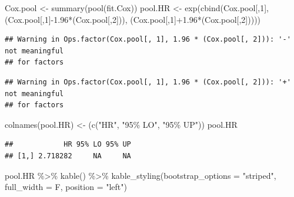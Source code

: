 \documentclass[
]{book}
\newenvironment{Shaded}{\begin{snugshade}}{\end{snugshade}}
\newcommand{\AttributeTok}[1]{\textcolor[rgb]{0.77,0.63,0.00}{#1}}
\newcommand{\DecValTok}[1]{\textcolor[rgb]{0.00,0.00,0.81}{#1}}
\newcommand{\FloatTok}[1]{\textcolor[rgb]{0.00,0.00,0.81}{#1}}
\newcommand{\FunctionTok}[1]{\textcolor[rgb]{0.00,0.00,0.00}{#1}}
\newcommand{\NormalTok}[1]{#1}
\newcommand{\OtherTok}[1]{\textcolor[rgb]{0.56,0.35,0.01}{#1}}
\newcommand{\SpecialCharTok}[1]{\textcolor[rgb]{0.00,0.00,0.00}{#1}}
\newcommand{\StringTok}[1]{\textcolor[rgb]{0.31,0.60,0.02}{#1}}
\begin{document}
\begin{Shaded}
\begin{Highlighting}[]
\NormalTok{Cox.pool }\OtherTok{\textless{}{-}} \FunctionTok{summary}\NormalTok{(}\FunctionTok{pool}\NormalTok{(fit.Cox))}
\NormalTok{pool.HR }\OtherTok{\textless{}{-}} \FunctionTok{exp}\NormalTok{(}\FunctionTok{cbind}\NormalTok{(Cox.pool[,}\DecValTok{1}\NormalTok{], (Cox.pool[,}\DecValTok{1}\NormalTok{]}\SpecialCharTok{{-}}\FloatTok{1.96}\SpecialCharTok{*}\NormalTok{(Cox.pool[,}\DecValTok{2}\NormalTok{])), }
\NormalTok{           (Cox.pool[,}\DecValTok{1}\NormalTok{]}\SpecialCharTok{+}\FloatTok{1.96}\SpecialCharTok{*}\NormalTok{(Cox.pool[,}\DecValTok{2}\NormalTok{]))))}
\end{Highlighting}
\end{Shaded}

\begin{verbatim}
## Warning in Ops.factor(Cox.pool[, 1], 1.96 * (Cox.pool[, 2])): '-' not meaningful
## for factors
\end{verbatim}

\begin{verbatim}
## Warning in Ops.factor(Cox.pool[, 1], 1.96 * (Cox.pool[, 2])): '+' not meaningful
## for factors
\end{verbatim}

\begin{Shaded}
\begin{Highlighting}[]
\FunctionTok{colnames}\NormalTok{(pool.HR) }\OtherTok{\textless{}{-}}\NormalTok{ (}\FunctionTok{c}\NormalTok{(}\StringTok{"HR"}\NormalTok{, }\StringTok{"95\% LO"}\NormalTok{, }\StringTok{"95\% UP"}\NormalTok{))}
\NormalTok{pool.HR}
\end{Highlighting}
\end{Shaded}

\begin{verbatim}
##            HR 95% LO 95% UP
## [1,] 2.718282     NA     NA
\end{verbatim}

\begin{Shaded}
\begin{Highlighting}[]
\NormalTok{pool.HR }\SpecialCharTok{\%\textgreater{}\%}
  \FunctionTok{kable}\NormalTok{() }\SpecialCharTok{\%\textgreater{}\%}
  \FunctionTok{kable\_styling}\NormalTok{(}\AttributeTok{bootstrap\_options =} \StringTok{"striped"}\NormalTok{, }\AttributeTok{full\_width =}\NormalTok{ F, }\AttributeTok{position =} \StringTok{"left"}\NormalTok{)}
\end{Highlighting}
\end{Shaded}
\end{document}

